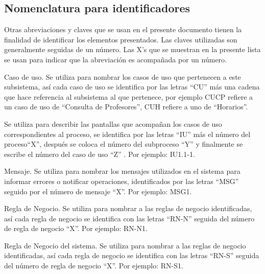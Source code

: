 \subsection{Nomenclatura para identificadores}\label{ssec:nomenclatura}

Otras abreviaciones y claves que se usan en el presente documento tienen la finalidad de identificar los elementos presentados. Las claves utilizadas son generalmente seguidas de un número. Las X’s que se muestran en la presente lista se usan para indicar que la abreviación es acompañada por un número.

\begin{description}
	
	 Caso de uso. Se utiliza para nombrar los casos de uso que pertenecen a este subsistema, así cada caso de uso se identifica por las letras ``CU'' más una cadena que hace referencia al subsistema al que pertenece, por ejemplo CUCP refiere a un caso de uso de ``Consulta de Profesores'', CUH refiere a uno de ``Horarios''.
	
	 Se utiliza para describir las pantallas que acompañan los casos de uso correspondientes al proceso, se identifica por las letras ``IU'' más el número del proceso``X'', después se coloca el número del subproceso ``Y'' y finalmente se escribe el número del caso de uso ``Z'' . Por ejemplo: IU1.1-1.

	 Mensaje. Se utiliza para nombrar los mensajes utilizados en el sistema para informar errores o notificar operaciones, identificados por las letras ``MSG'' seguido por el número de mensaje ``X''. Por ejemplo: MSG1.
	
	 Regla de Negocio. Se utiliza para nombrar a las reglas de negocio identificadas, así cada regla de negocio se identifica con las letras ``RN-N'' seguida del número de regla de negocio ``X''. Por ejemplo: RN-N1.
	
	 Regla de Negocio del sistema. Se utiliza para nombrar a las reglas de negocio identificadas, así cada regla de negocio se identifica con las letras ``RN-S'' seguida del número de regla de negocio ``X''. Por ejemplo: RN-S1.	
		
\end{description}